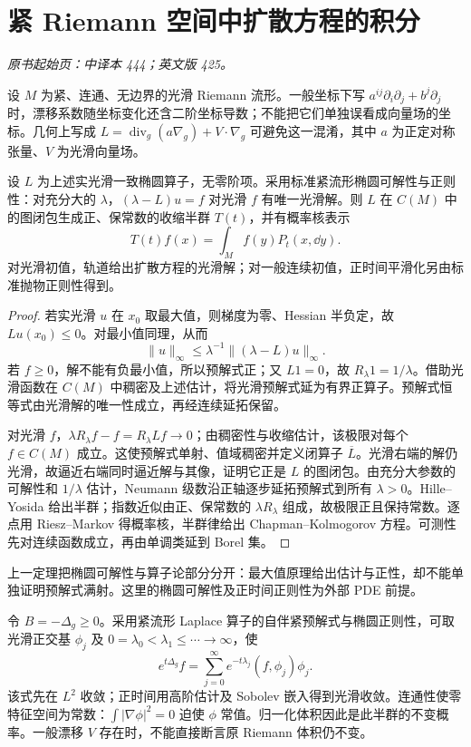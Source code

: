 \section{紧 Riemann 空间中扩散方程的积分}\label{sec:yosida-14-02}
\noindent\textit{原书起始页：中译本 444；英文版 425。}

设 $M$ 为紧、连通、无边界的光滑 Riemann 流形。一般坐标下写 $a^{ij}\partial_i\partial_j+b^j\partial_j$ 时，漂移系数随坐标变化还含二阶坐标导数；不能把它们单独误看成向量场的坐标。几何上写成 $L=\operatorname{div}_g(a\nabla_g)+V\cdot\nabla_g$ 可避免这一混淆，其中 $a$ 为正定对称张量、$V$ 为光滑向量场。

\begin{theorem}\label{thm:y14-compact-markov}
设 $L$ 为上述实光滑一致椭圆算子，无零阶项。采用标准紧流形椭圆可解性与正则性：对充分大的 $\lambda$，$(\lambda-L)u=f$ 对光滑 $f$ 有唯一光滑解。则 $L$ 在 $C(M)$ 中的图闭包生成正、保常数的收缩半群 $T(t)$，并有概率核表示
\[
 T(t)f(x)=\int_M f(y)P_t(x,\dd y).
\]
对光滑初值，轨道给出扩散方程的光滑解；对一般连续初值，正时间平滑化另由标准抛物正则性得到。
\end{theorem}
\begin{proof}
若实光滑 $u$ 在 $x_0$ 取最大值，则梯度为零、Hessian 半负定，故 $Lu(x_0)\le0$。对最小值同理，从而
\[
 \|u\|_\infty\le\lambda^{-1}\|(\lambda-L)u\|_\infty.
\]
若 $f\ge0$，解不能有负最小值，所以预解式正；又 $L1=0$，故 $R_\lambda1=1/\lambda$。借助光滑函数在 $C(M)$ 中稠密及上述估计，将光滑预解式延为有界正算子。预解式恒等式由光滑解的唯一性成立，再经连续延拓保留。

对光滑 $f$，$\lambda R_\lambda f-f=R_\lambda Lf\to0$；由稠密性与收缩估计，该极限对每个 $f\in C(M)$ 成立。这使预解式单射、值域稠密并定义闭算子 $\overline L$。光滑右端的解仍光滑，故逼近右端同时逼近解与其像，证明它正是 $L$ 的图闭包。由充分大参数的可解性和 $1/\lambda$ 估计，Neumann 级数沿正轴逐步延拓预解式到所有 $\lambda>0$。Hille--Yosida 给出半群；指数近似由正、保常数的 $\lambda R_\lambda$ 组成，故极限正且保持常数。逐点用 Riesz--Markov 得概率核，半群律给出 Chapman--Kolmogorov 方程。可测性先对连续函数成立，再由单调类延到 Borel 集。
\end{proof}

上一定理把椭圆可解性与算子论部分分开：最大值原理给出估计与正性，却不能单独证明预解式满射。这里的椭圆可解性及正时间正则性为外部 PDE 前提。

\begin{example}
令 $B=-\Delta_g\ge0$。采用紧流形 Laplace 算子的自伴紧预解式与椭圆正则性，可取光滑正交基 $\phi_j$ 及 $0=\lambda_0<\lambda_1\le\cdots\to\infty$，使
\[
 e^{t\Delta_g}f=\sum_{j=0}^\infty e^{-t\lambda_j}(f,\phi_j)\phi_j.
\]
该式先在 $L^2$ 收敛；正时间用高阶估计及 Sobolev 嵌入得到光滑收敛。连通性使零特征空间为常数：$\int|\nabla\phi|^2=0$ 迫使 $\phi$ 常值。归一化体积因此是此半群的不变概率。一般漂移 $V$ 存在时，不能直接断言原 Riemann 体积仍不变。
\end{example}

